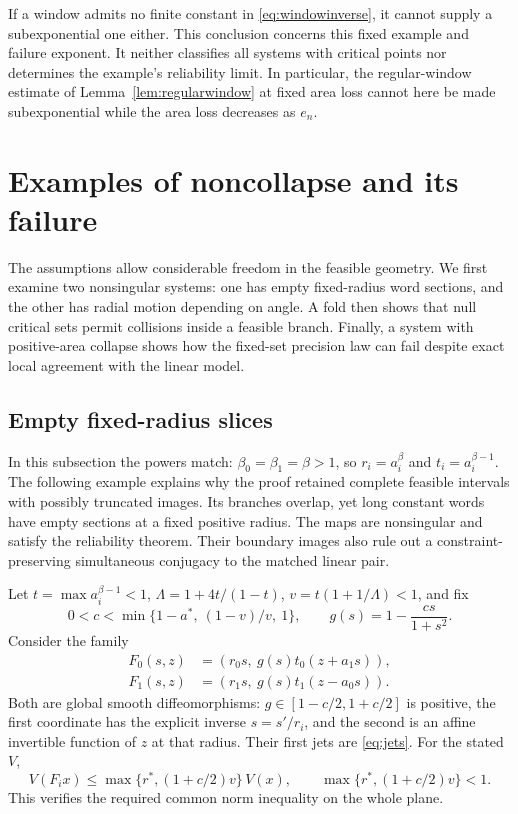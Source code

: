 \documentclass[11pt]{amsart}
\theoremstyle{definition}
\theoremstyle{remark}
\numberwithin{equation}{section}
\begin{document}
If a window admits no finite constant in \eqref{eq:windowinverse},
it cannot supply a subexponential one either. This conclusion concerns
this fixed example and failure exponent. It neither classifies all
systems with critical points nor determines the example's reliability
limit. In particular, the regular-window estimate of
Lemma~\ref{lem:regularwindow} at fixed area loss cannot here be
made subexponential while the area loss decreases as $e_n$.

\section{Examples of noncollapse and its failure}\label{sec:examples}
The assumptions allow considerable freedom in the feasible geometry.
We first examine two nonsingular systems: one has empty fixed-radius
word sections, and the other has radial motion depending on angle.
A fold then shows that null critical sets permit collisions inside
a feasible branch. Finally, a system with positive-area collapse
shows how the fixed-set precision law can fail despite exact local
agreement with the linear model.

\subsection{Empty fixed-radius slices}
\label{sec:inward}
In this subsection the powers match: $\beta_0=\beta_1=\beta>1$,
so $r_i=a_i^\beta$ and $t_i=a_i^{\beta-1}$.
The following example explains why the proof retained complete
feasible intervals with possibly truncated images. Its branches
overlap, yet long constant words have empty sections at a fixed
positive radius. The maps are nonsingular and satisfy the
reliability theorem. Their boundary images also rule out a
constraint-preserving simultaneous conjugacy to the matched
linear pair.

Let \(t=\max a_i^{\beta-1}<1\),
\(\Lambda=1+4t/(1-t)\), \(v=t(1+1/\Lambda)<1\), and fix
\[
       0<c<\min\{1-a^*,\ (1-v)/v,\ 1\},\qquad
       g(s)=1-\frac{cs}{1+s^2}.
\]
Consider the family
\begin{equation}
\begin{split}
 F_0(s,z)&=(r_0s,\ g(s)t_0(z+a_1s)),\\
 F_1(s,z)&=(r_1s,\ g(s)t_1(z-a_0s)).                         \label{eq:inward}
\end{split}
\end{equation}
Both are global smooth diffeomorphisms: \(g\in[1-c/2,1+c/2]\)
is positive, the first coordinate has the explicit inverse
\(s=s'/r_i\), and the second is an affine invertible function of
\(z\) at that radius. Their first jets are \eqref{eq:jets}.
For the stated \(V\),
\begin{equation}
V(F_i x)\le\max\{r^*,(1+c/2)v\}\,V(x),
 \qquad \max\{r^*,(1+c/2)v\}<1.                            \label{eq:inwardnorm}
\end{equation}
This verifies the required common norm inequality on the whole
plane.
\end{document}
